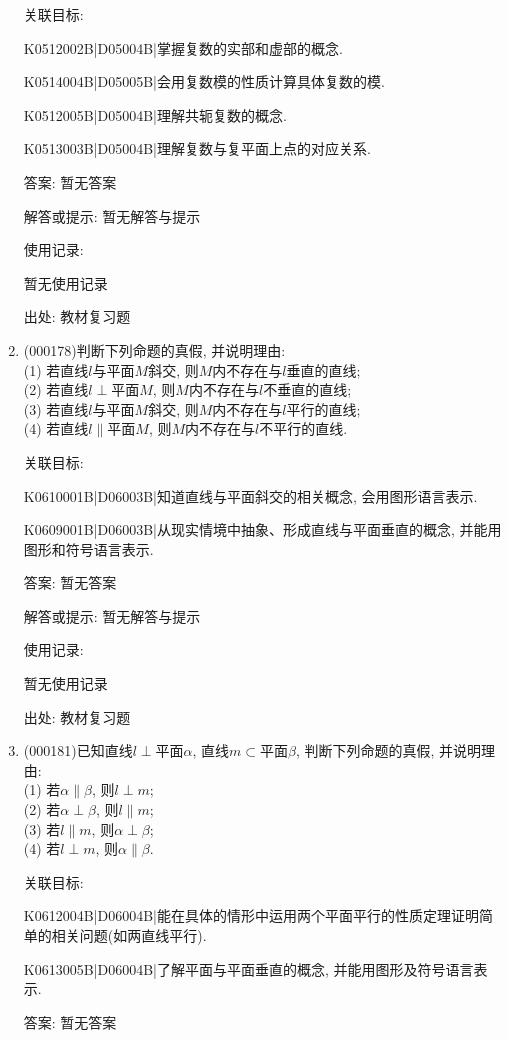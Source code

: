 \documentclass[10pt,a4paper]{article}
\begin{document}
\begin{enumerate}[1.]
关联目标:

K0512002B|D05004B|掌握复数的实部和虚部的概念.

K0514004B|D05005B|会用复数模的性质计算具体复数的模.

K0512005B|D05004B|理解共轭复数的概念.

K0513003B|D05004B|理解复数与复平面上点的对应关系.

答案: 暂无答案

解答或提示: 暂无解答与提示

使用记录:

暂无使用记录


出处: 教材复习题
\item { (000178)}判断下列命题的真假, 并说明理由:\\
(1) 若直线$l$与平面$M$斜交, 则$M$内不存在与$l$垂直的直线;\\
(2) 若直线$l\perp\text{平面}M$, 则$M$内不存在与$l$不垂直的直线;\\
(3) 若直线$l$与平面$M$斜交, 则$M$内不存在与$l$平行的直线;\\
(4) 若直线$l\parallel\text{平面}M$, 则$M$内不存在与$l$不平行的直线.


关联目标:

K0610001B|D06003B|知道直线与平面斜交的相关概念, 会用图形语言表示.

K0609001B|D06003B|从现实情境中抽象、形成直线与平面垂直的概念, 并能用图形和符号语言表示.

答案: 暂无答案

解答或提示: 暂无解答与提示

使用记录:

暂无使用记录


出处: 教材复习题
\item { (000181)}已知直线$l\perp\text{平面}\alpha$, 直线$m\subset\text{平面}\beta$, 判断下列命题的真假, 并说明理由:\\
(1) 若$\alpha\parallel \beta$, 则$l\perp m$;\\
(2) 若$\alpha\perp \beta$, 则$l\parallel m$;\\
(3) 若$l\parallel m$, 则$\alpha\perp \beta$;\\
(4) 若$l\perp m$, 则$\alpha\parallel \beta$.


关联目标:

K0612004B|D06004B|能在具体的情形中运用两个平面平行的性质定理证明简单的相关问题(如两直线平行).

K0613005B|D06004B|了解平面与平面垂直的概念, 并能用图形及符号语言表示.

答案: 暂无答案


\end{enumerate}
\end{document}

